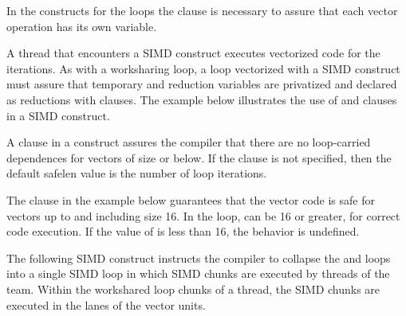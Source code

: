 In the  constructs for the loops the  clause is 
necessary to assure that each vector operation has its own 
variable.



{}
A thread that encounters a SIMD construct executes vectorized code for the 
iterations. As with a worksharing loop, a loop vectorized 
with a SIMD construct must assure that temporary and reduction variables are 
privatized and declared as reductions with clauses.  The example below 
illustrates the use of  and  clauses in a SIMD 
construct.




{}
A  clause in a  construct assures the compiler that 
there are no loop-carried dependences for vectors of size  or below. If
the  clause is not specified, then the default safelen value is 
the number of loop iterations.
 
The  clause in the example below guarantees that the vector 
code is safe for vectors up to and including size 16.  In the loop,  can 
be 16 or greater, for correct code execution.  If the value of  is less 
than 16, the behavior is undefined.



{}
The following SIMD construct instructs the compiler to collapse the  and 
 loops into a single SIMD loop in which SIMD chunks are executed by 
threads of the team. Within the workshared loop chunks of a thread, the SIMD 
chunks are executed in the lanes of the vector units.




